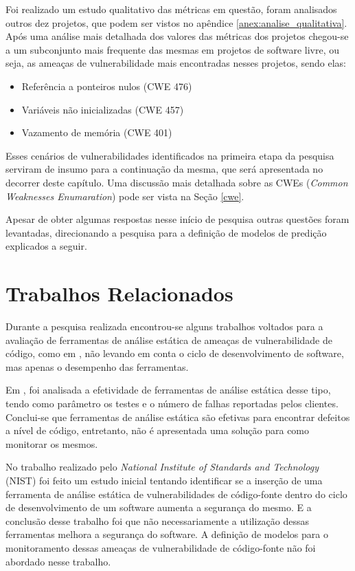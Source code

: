 Foi realizado um estudo qualitativo das métricas em questão, foram analisados
outros dez projetos, que podem ser vistos no apêndice
\ref{anex:analise_qualitativa}. Após uma análise mais detalhada dos valores das
métricas dos projetos chegou-se a um subconjunto mais frequente das mesmas em
projetos de software livre, ou seja, as ameaças de vulnerabilidade mais
encontradas nesses projetos, sendo elas:

\begin{itemize}\label{principais_vuln}
  \item Referência a ponteiros nulos (CWE 476)
  \item Variáveis não inicializadas (CWE 457)
  \item Vazamento de memória (CWE 401)
\end{itemize}

Esses cenários de vulnerabilidades identificados na primeira etapa da pesquisa
serviram de insumo para a continuação da mesma, que será apresentada no decorrer
deste capítulo. Uma discussão mais detalhada sobre as CWEs (\textit{Common Weaknesses
Enumaration}) pode ser vista na Seção \ref{cwe}.

Apesar de obter algumas respostas nesse início de pesquisa outras questões
foram levantadas, direcionando a pesquisa para a definição de modelos de
predição explicados a seguir.




\section{Trabalhos Relacionados}\label{metodologia:trabalhosrelacionados}

Durante a pesquisa realizada encontrou-se alguns trabalhos voltados para a
avaliação de ferramentas de análise estática de ameaças de vulnerabilidade de
código, como em , não levando em conta
o ciclo de desenvolvimento de software, mas apenas o desempenho das ferramentas.

Em , foi analisada a efetividade de ferramentas
de análise estática desse tipo, tendo como parâmetro os testes e o número de
falhas reportadas pelos clientes. Conclui-se que ferramentas de análise estática
são efetivas para encontrar defeitos a nível de código, entretanto, não é
apresentada uma solução para como monitorar os mesmos.

No trabalho realizado pelo \textit{National Institute of Standards and
Technology} (NIST) \cite{nist_effect_static_analysis:2007} foi feito um estudo
inicial tentando identificar se a inserção de uma ferramenta de análise estática
de vulnerabilidades de código-fonte dentro do ciclo de desenvolvimento de um
software aumenta a segurança do mesmo. E a conclusão desse trabalho foi que não
necessariamente a utilização dessas ferramentas melhora a segurança do
software. A definição de modelos para o monitoramento dessas ameaças de
vulnerabilidade de código-fonte não foi abordado nesse trabalho.

